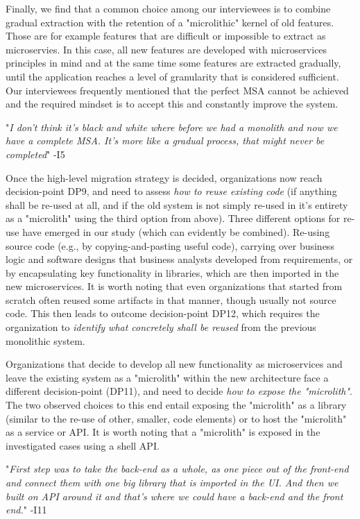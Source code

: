 \documentclass[sigconf,dvipsnames]{acmart}
\newcommand{\interviewquote}[2]{
 \def\FrameCommand{%
    \hspace{0pt}%
    {\color{MidnightBlue}\vrule width 1.5pt}%
    {\color{white}\vrule width 4pt}%
    \colorbox{white}
  }%
  \MakeFramed{\advance\hsize-\width\FrameRestore}%
  \noindent\hspace{-4.55pt}%
  \footnotesize{"\emph{#1}" -{#2}}\vspace{0.5pt}\endMakeFramed%
}
\begin{document}
Finally, we find that a common choice among our interviewees is to combine gradual extraction with the retention of a "microlithic" kernel of old features. Those are for example features that are difficult or impossible to extract as microservies.
In this case, all new features are developed with microservices principles in mind and at the same time some features are extracted gradually, until the application reaches a level of granularity that is considered sufficient.
Our interviewees frequently mentioned that the perfect MSA cannot be achieved and the required mindset is to accept this and constantly improve the system.
\interviewquote{I don't think it's black and white where before we had a monolith and now we have a complete MSA. It's more like a gradual process, that might never be completed}{I5}


Once the high-level migration strategy is decided, organizations now reach decision-point DP9, and need to assess \emph{how to reuse existing code} (if anything shall be re-used at all, and if the old system is not simply re-used in it's entirety as a "microlith" using the third option from above).
Three different options for re-use have emerged in our study (which can evidently be combined). Re-using source code (e.g., by copying-and-pasting useful code), carrying over business logic and software designs that business analysts developed from requirements, or by encapsulating key functionality in libraries, which are then imported in the new microservices. It is worth noting that even organizations that started from scratch often reused some artifacts in that manner, though usually not source code.
This then leads to outcome decision-point DP12, which requires the organization to \emph{identify what concretely shall be reused} from the previous monolithic system.

Organizations that decide to develop all new functionality as microservices and leave the existing system as a "microlith" within the new architecture face a different decision-point (DP11), and need to decide \emph{how to expose the "microlith"}. The two observed choices to this end entail exposing the "microlith" as a library (similar to the re-use of other, smaller, code elements) or to host the "microlith" as a service or API. It is worth noting that a "microlith" is exposed in the investigated cases using a shell API.
\interviewquote{First step was to take the back-end as a whole, as one piece out of the front-end and connect them with one big library that is imported in the UI. And then we built on API around it and that's where we could have a back-end and the front end.}{I11}
\end{document}
